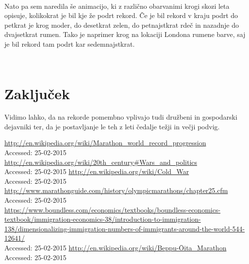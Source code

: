 \documentclass[11pt,a4paper]{article}
\begin{document}
\begin{center}
\\
\end{center}

Nato pa sem naredila še animacijo, ki z različno obarvanimi krogi skozi leta opisuje, kolikokrat je bil kje že podrt rekord. Če je bil rekord v kraju podrt do petkrat je krog moder, do desetkrat zelen, do petnajstkrat rdeč in nazadnje do dvajsetkrat rumen. Tako je naprimer krog na lokaciji Londona rumene barve, saj je bil rekord tam podrt kar sedemnajstkrat.

\begin{center}
\\
\end{center}

\section{Zaključek}
Vidimo lahko, da na rekorde pomembno vplivajo tudi družbeni in gospodarski dejavniki ter, da je postavljanje le teh z leti čedalje težji in večji podvig.

\newpage
\begin{thebibliography}{6}
  \url{http://en.wikipedia.org/wiki/Marathon_world_record_progression}\\
  {Accessed: 25-02-2015}
  \url{http://en.wikipedia.org/wiki/20th_century#Wars_and_politics}\\
  {Accessed: 25-02-2015}
  \url{http://en.wikipedia.org/wiki/Cold_War}\\
  {Accessed: 25-02-2015}
  \url{http://www.marathonguide.com/history/olympicmarathons/chapter25.cfm}\\
  {Accessed: 25-02-2015}
  \url{ https://www.boundless.com/economics/textbooks/boundless-economics-textbook/immigration-economics-38/introduction-to-immigration-138/dimensionalizing-immigration-numbers-of-immigrants-around-the-world-544-12641/}\\
  {Accessed: 25-02-2015}
  \url{ http://en.wikipedia.org/wiki/Beppu-Ōita_Marathon}\\
  {Accessed: 25-02-2015}
 
 

\end{thebibliography}
\end{document}
